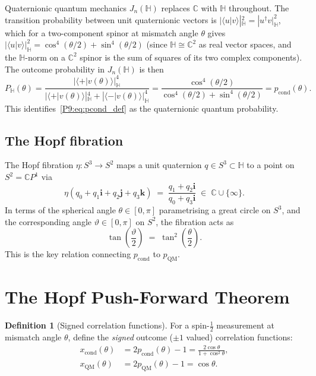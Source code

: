\documentclass[11pt,a4paper]{article}
\theoremstyle{definition}
\newtheorem{definition}[theorem]{Definition}
\theoremstyle{remark}
\newcommand{\CC}{\mathbb{C}}
\newcommand{\HH}{\mathbb{H}}
\newcommand{\pcond}{p_{\mathrm{cond}}}
\newcommand{\pQM}{p_{\mathrm{QM}}}
\newcommand{\xcond}{x_{\mathrm{cond}}}
\begin{document}
Quaternionic quantum mechanics $J_n(\HH)$ replaces $\CC$ with $\HH$
throughout.
The transition probability between unit quaternionic vectors is
$|\langle u|v\rangle|_\HH^2 = |u^\dagger v|_\HH^2$,
which for a two-component spinor at mismatch angle $\theta$ gives
$|\langle u|v\rangle|_\HH^2 = \cos^4(\theta/2) + \sin^4(\theta/2)$
(since $\HH\cong\CC^2$ as real vector spaces, and the $\HH$-norm on a
$\CC^2$ spinor is the sum of squares of its two complex components).
The outcome probability in $J_n(\HH)$ is then
\begin{equation}
  P_\HH(\theta)
  = \frac{|\langle +|v(\theta)\rangle|_\HH^4}
         {|\langle +|v(\theta)\rangle|_\HH^4 + |\langle -|v(\theta)\rangle|_\HH^4}
  = \frac{\cos^4(\theta/2)}{\cos^4(\theta/2)+\sin^4(\theta/2)}
  = \pcond(\theta).
  \label{P9:eq:PH_is_Pcond}
\end{equation}
This identifies~\eqref{P9:eq:pcond_def} as the quaternionic quantum probability.
 
\subsection{The Hopf fibration}
 
The Hopf fibration $\eta: S^3\to S^2$ maps a unit quaternion $q\in S^3
\subset\HH$ to a point on $S^2 = \CC P^1$ via
\begin{equation}
  \eta(q_0+q_1\mathbf{i}+q_2\mathbf{j}+q_3\mathbf{k})
  \;=\; \frac{q_1+q_2\mathbf{i}}{q_0+q_3\mathbf{i}} \;\in\; \CC\cup\{\infty\}.
  \label{P9:eq:hopf_map}
\end{equation}
In terms of the spherical angle $\theta\in[0,\pi]$ parametrising a
great circle on $S^3$, and the corresponding angle $\vartheta\in[0,\pi]$
on $S^2$, the fibration acts as
\begin{equation}
  \tan\!\left(\frac{\vartheta}{2}\right)
  \;=\; \tan^2\!\left(\frac{\theta}{2}\right).
  \label{P9:eq:hopf_angle}
\end{equation}
This is the key relation connecting $\pcond$ to $\pQM$.
 
\section{The Hopf Push-Forward Theorem}
\label{P9:sec:hopf}
 
\begin{definition}[Signed correlation functions]
For a spin-$\tfrac{1}{2}$ measurement at mismatch angle $\theta$,
define the \emph{signed} outcome ($\pm1$ valued) correlation functions:
\begin{align}
  \xcond(\theta) &= 2\pcond(\theta) - 1
  = \boxed{\frac{2\cos\theta}{1+\cos^2\theta}}, \label{P9:eq:xcond}\\
  x_\mathrm{QM}(\theta) &= 2\pQM(\theta) - 1 = \cos\theta. \label{P9:eq:xQM}
\end{align}
\end{definition}
 
\end{document}
